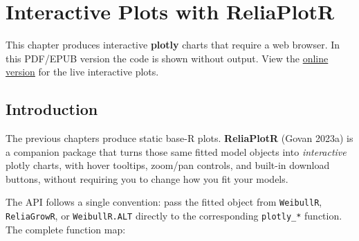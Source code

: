 \documentclass[
  letterpaper,
  DIV=11,
  numbers=noendperiod]{scrreprt}
\begin{document}

\chapter{Interactive Plots with ReliaPlotR}\label{sec-reliaplotr}

\begin{tcolorbox}[enhanced jigsaw, arc=.35mm, bottomrule=.15mm, bottomtitle=1mm, breakable, colback=white, colbacktitle=quarto-callout-note-color!10!white, colframe=quarto-callout-note-color-frame, coltitle=black, left=2mm, leftrule=.75mm, opacityback=0, opacitybacktitle=0.6, rightrule=.15mm, title=\textcolor{quarto-callout-note-color}{\faInfo}\hspace{0.5em}{HTML-Only Content}, titlerule=0mm, toprule=.15mm, toptitle=1mm]

This chapter produces interactive \textbf{plotly} charts that require a
web browser. In this PDF/EPUB version the code is shown without output.
View the \href{https://paulgovan.github.io/ReliaLearnR/}{online version}
for the live interactive plots.

\end{tcolorbox}

\section{Introduction}\label{introduction-6}

The previous chapters produce static base-R plots. \textbf{ReliaPlotR}
(Govan 2023a) is a companion package that turns those same fitted model
objects into \emph{interactive} plotly charts, with hover tooltips,
zoom/pan controls, and built-in download buttons, without requiring you
to change how you fit your models.

The API follows a single convention: pass the fitted object from
\texttt{WeibullR}, \texttt{ReliaGrowR}, or \texttt{WeibullR.ALT}
directly to the corresponding \texttt{plotly\_*} function. The complete
function map:
\end{document}
